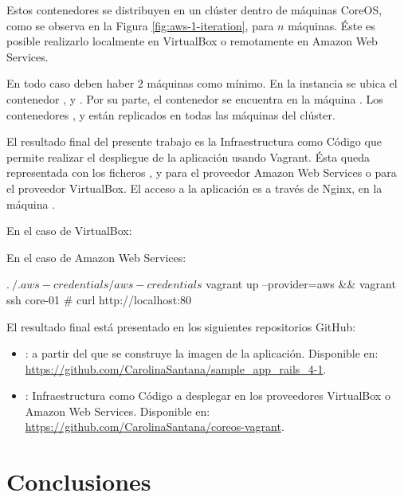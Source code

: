 Estos contenedores se distribuyen en un clúster dentro de máquinas CoreOS, como se observa en la Figura \ref{fig:aws-1-iteration}, para $n$ máquinas. Éste es posible realizarlo localmente en VirtualBox o remotamente en Amazon Web Services. 

En todo caso deben haber 2 máquinas como mínimo. En la instancia  se ubica el contenedor ,  y . Por su parte, el contenedor  se encuentra en la máquina . Los contenedores ,  y  están replicados en todas las máquinas del clúster. 

El resultado final del presente trabajo es la Infraestructura como Código que permite realizar el despliegue de la aplicación usando Vagrant. Ésta queda representada con los ficheros ,  y  para el proveedor Amazon Web Services o  para el proveedor VirtualBox. El acceso a la aplicación es a través de Nginx, en la máquina .

En el caso de VirtualBox:


En el caso de Amazon Web Services:

\begin{code}
$ . ~/.aws-credentials/aws-credentials
$ vagrant up --provider=aws && vagrant ssh core-01
# curl http://localhost:80
\end{code}

El resultado final está presentado en los siguientes repositorios GitHub:
\begin{itemize}
\item {}: a partir del que se construye la imagen de la aplicación. Disponible en: \url{https://github.com/CarolinaSantana/sample_app_rails_4-1}.
\item {}: Infraestructura como Código a desplegar en los proveedores VirtualBox o Amazon Web Services. Disponible en: \url{https://github.com/CarolinaSantana/coreos-vagrant}.
\end{itemize}

\section{Conclusiones}

